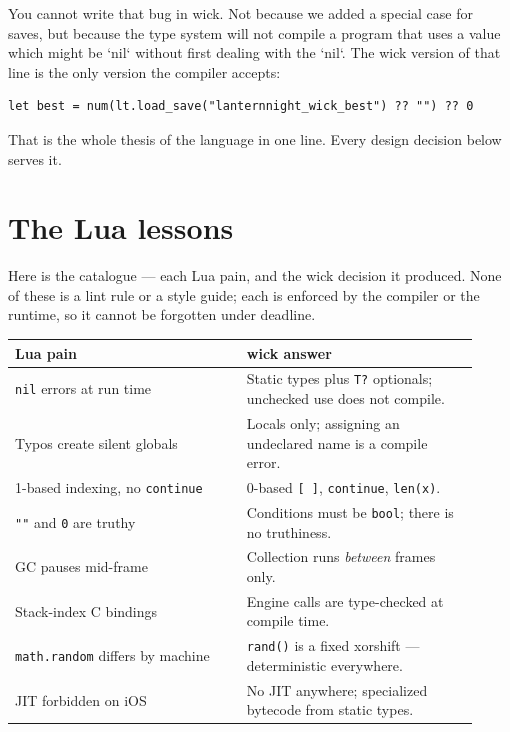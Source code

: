 You cannot write that bug in wick. Not because we added a special case for
saves, but because the type system will not compile a program that uses a
value which might be `nil` without first dealing with the `nil`. The wick
version of that line is the only version the compiler accepts:

\begin{lstlisting}[language=wick]
let best = num(lt.load_save("lanternnight_wick_best") ?? "") ?? 0
\end{lstlisting}

\noindent
That is the whole thesis of the language in one line. Every design decision
below serves it.

\section{The Lua lessons}

Here is the catalogue --- each Lua pain, and the wick decision it produced.
None of these is a lint rule or a style guide; each is enforced by the
compiler or the runtime, so it cannot be forgotten under deadline.

\begin{center}
\begin{tabular}{@{}p{0.46\linewidth}p{0.46\linewidth}@{}}
\toprule
\textbf{Lua pain} & \textbf{wick answer} \\
\midrule
\texttt{nil} errors at run time &
Static types plus \texttt{T?} optionals; unchecked use does not compile. \\
Typos create silent globals &
Locals only; assigning an undeclared name is a compile error. \\
1-based indexing, no \texttt{continue} &
0-based \texttt{[\,]}, \texttt{continue}, \texttt{len(x)}. \\
\texttt{""} and \texttt{0} are truthy &
Conditions must be \texttt{bool}; there is no truthiness. \\
GC pauses mid-frame &
Collection runs \emph{between} frames only. \\
Stack-index C bindings &
Engine calls are type-checked at compile time. \\
\texttt{math.random} differs by machine &
\texttt{rand()} is a fixed xorshift --- deterministic everywhere. \\
JIT forbidden on iOS &
No JIT anywhere; specialized bytecode from static types. \\
\bottomrule
\end{tabular}
\end{center}

